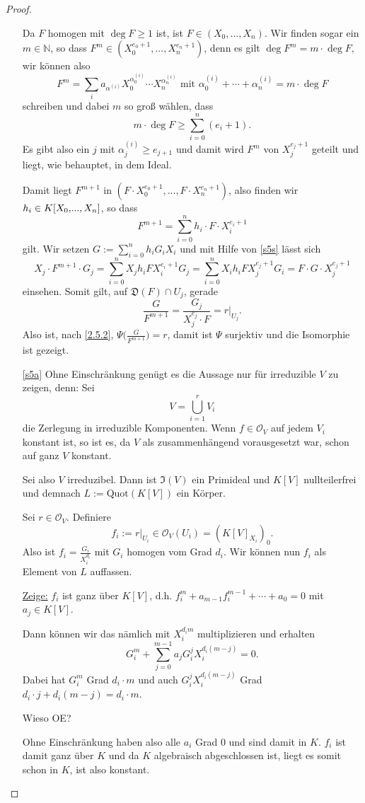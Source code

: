 \documentclass[a4paper,12pt]{scrbook}
\newtheorem{proof}{Beweis}
\def\I{\mathfrak{I}}
\def\O{\mathcal{O}}
\newcommand{\D}{\mathfrak{D}}
\newcommand{\Quot}{\mathrm{Quot}}
\newcommand{\restrict}[1]{|_{#1}}
\renewcommand{\dotsc}{\ensuremath{\!...}}
\newcommand{\set}[1]{\ensuremath{\mathbb{#1}}}
\newcommand{\N}{\set{N}}
\newcommand{\ppolyx}[1][n]{\ensuremath%
  [X_{0},\dotsc,X_{#1}]}
\begin{document}
\begin{proof}
\begin{enumerate}
Da $F$ homogen mit $\deg F\geq 1$ ist, ist $F\in(X_{0},\dotsc,X_{n})$. Wir finden sogar ein $m\in\N$, so dass $F^{m}\in(X_{0}^{e_{0}+1},\dotsc,X_{n}^{e_{n}+1})$, denn es gilt $\deg F^{m}=m\cdot\deg F$, wir können also
\[F^{m}=\sum_{i}a_{\alpha^{(i)}}X_{0}^{\alpha_{0}^{(i)}}\dotsm X_{n}^{\alpha_{n}^{(i)}}\text{ mit }\alpha_{0}^{(i)}+\dotsm+\alpha_{n}^{(i)}=m\cdot\deg F\]
schreiben und dabei $m$ so groß wählen, dass
\[m\cdot\deg F\geq\sum_{i=0}^{n}(e_{i}+1).\]
Es gibt also ein $j$ mit $\alpha_{j}^{(i)}\geq e_{j+1}$ und damit wird $F^{m}$ von $X_{j}^{e_{j}+1}$ geteilt und liegt, wie behauptet, in dem Ideal.

Damit liegt $F^{m+1}$ in $(F\cdot X_{0}^{e_{0}+1},\dotsc,F\cdot X_{n}^{e_{n}+1})$, also finden wir $h_{i}\in K\ppolyx$, so dass
\[F^{m+1}=\sum_{i=0}^{n}h_{i}\cdot F\cdot X_{i}^{e_{i}+1}\]
gilt. Wir setzen $\displaystyle G:=\sum_{i=0}^{n}h_{i}G_{i}X_{i}$ und mit Hilfe von \cref{s5s} lässt sich
\[X_{j}\cdot F^{m+1}\cdot G_{j}=\sum_{i=0}^{n}X_{j}h_{i}FX_{i}^{e_{i}+1}G_{j}=\sum_{i=0}^{n}X_{i}h_{i}FX_{j}^{e_{j}+1}G_{i}=F\cdot G\cdot X_{j}^{e_{j}+1}\]
einsehen. Somit gilt, auf $\D(F)\cap U_{j}$, gerade \[\frac{G}{F^{m+1}}=\frac{G_{j}}{X_{j}^{e_{j}}\cdot F}=r\restrict{U_{j}}.\] Also ist, nach \cref{2.5.2}, $\Psi\bigl(\frac{G}{F^{m+1}}\bigr)=r$, damit ist $\Psi$ surjektiv und die Isomorphie ist gezeigt.

\item[\ref{s5a}] Ohne Einschränkung genügt es die Aussage nur für irreduzible $V$ zu zeigen, denn: Sei
\[V=\bigcup_{i=1}^{r}V_{i}\]
die Zerlegung in irreduzible Komponenten. Wenn $f\in\O_{V}$ auf jedem $V_{i}$ konstant ist, so ist es, da $V$ als zusammenhängend vorausgesetzt war, schon auf ganz $V$ konstant.

Sei also $V$ irreduzibel. Dann ist $\I(V)$ ein Primideal und $K[V]$ nullteilerfrei und demnach $L:=\Quot(K[V])$ ein Körper.

Sei $r\in\O_{V}$. Definiere
\[f_{i}:=r\restrict{U_{i}}\in\O_{V}(U_{i})=(K[V]_{X_{i}})_{0}.\]
Also ist $f_{i}=\frac{G_{i}}{X_{i}^{d_{i}}}$ mit $G_{i}$ homogen vom Grad $d_{i}$. Wir können nun $f_{i}$ als Element von $L$ auffassen.

\hyperlink{s5bzz}{{\sc Zeige:}} $f_{i}$ ist ganz über $K[V]$, d.h. $f_{i}^{m}+a_{m-1}f_{i}^{m-1}+\dotsm+a_{0}=0$ mit $a_{j}\in K[V]$.

Dann können wir das nämlich mit $X_{i}^{d_{i}m}$ multiplizieren und erhalten
\[G_{i}^{m}+\sum_{j=0}^{m-1}a_{j}G_{i}^{j}X_{i}^{d_{i}(m-j)}=0.\]
Dabei hat $G_{i}^{m}$ Grad $d_{i}\cdot m$ und auch $G_{i}^{j}X_{i}^{d_{i}(m-j)}$ Grad $d_{i}\cdot j+d_{i}(m-j)=d_{i}\cdot m$.
\begin{w}Wieso OE?\end{w}
Ohne Einschränkung haben also alle $a_{i}$ Grad $0$ und sind damit in $K$. $f_{i}$ ist damit ganz über $K$ und da $K$ algebraisch abgeschlossen ist, liegt es somit schon in $K$, ist also konstant.


\end{enumerate}
\end{proof}
\end{document}
